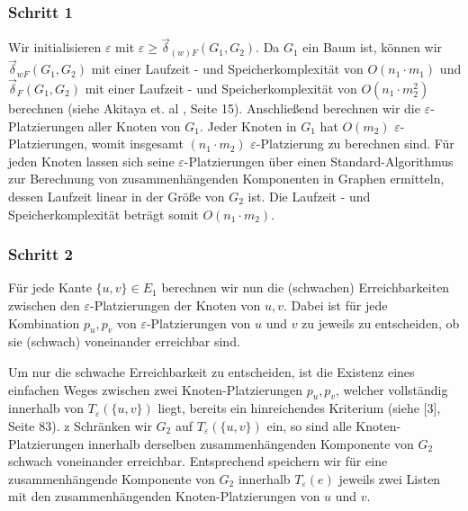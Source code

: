 \documentclass[a4paper, 12pt, twoside]{article}
\theoremstyle{Format1} %
\begin{document}
\subsubsection{Schritt 1} \label{Schritt 1}
Wir initialisieren $\varepsilon$ mit $\varepsilon \geq \vec{\delta}_{(w)F}(G_1, G_2)$.
Da $G_1$ ein Baum ist, können wir
$\vec{\delta}_{wF}(G_1, G_2)$ mit einer Laufzeit - und Speicherkomplexität von $O(n_1 \cdot m_1)$ und $\vec{\delta}_F(G_1, G_2)$ mit einer Laufzeit - und Speicherkomplexität
von $O(n_1 \cdot m_2^2)$ berechnen (siehe Akitaya et. al \cite{Akitaya}, Seite 15).
Anschließend berechnen wir die $\varepsilon$-Platzierungen aller Knoten von $G_1$. Jeder Knoten in $G_1$ hat $O(m_2)$
$\varepsilon$-Platzierungen, womit insgesamt $(n_1 \cdot m_2)$ $\varepsilon$-Platzierung zu berechnen sind.
Für jeden Knoten lassen sich seine $\varepsilon$-Platzierungen über einen Standard-Algorithmus zur Berechnung von
zusammenhängenden Komponenten in Graphen ermitteln, dessen Laufzeit linear in der Größe von $G_2$ ist.
Die Laufzeit - und Speicherkomplexität beträgt somit $O(n_1 \cdot m_2)$.

\subsubsection{Schritt 2} \label{Schritt 2}
Für jede Kante $\{u, v\} \in E_1$ berechnen wir nun die (schwachen) Erreichbarkeiten zwischen den $\varepsilon$-Platzierungen der Knoten von $u,v$.
Dabei ist für jede Kombination $p_u, p_v$ von $\varepsilon$-Platzierungen von $u$ und $v$ zu jeweils zu entscheiden, ob sie (schwach) voneinander erreichbar sind.

Um nur die schwache Erreichbarkeit zu entscheiden, ist die Existenz eines einfachen Weges zwischen zwei Knoten-Platzierungen
$p_u,p_v$, welcher vollständig innerhalb von $T_{\varepsilon}(\{u,v\})$ liegt, bereits ein hinreichendes Kriterium (siehe [3], Seite 83).
z
Schränken wir $G_2$ auf $T_{\varepsilon}(\{u,v\})$ ein, so sind alle Knoten-Platzierungen innerhalb derselben zusammenhängenden Komponente von $G_2$
schwach voneinander erreichbar. Entsprechend speichern wir für eine zusammenhängende Komponente von $G_2$ innerhalb $T_{\varepsilon}(e)$ jeweils zwei Listen mit den
zusammenhängenden Knoten-Platzierungen von $u$ und $v$.
\end{document}
